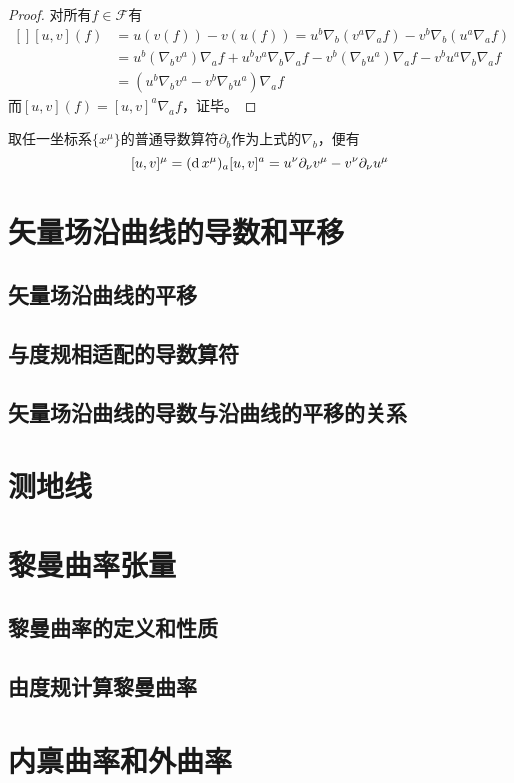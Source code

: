 \begin{proof}
对所有$f \in \mathscr{F}$有
$$\begin{aligned}[]
[u, v](f) & = u(v(f)) - v(u(f)) = u^b\nabla_b(v^a\nabla_af) - v^b\nabla_b(u^a\nabla_af) \\
& = u^b(\nabla_bv^a)\nabla_af + u^bv^a\nabla_b\nabla_af - v^b(\nabla_bu^a)\nabla_af - v^bu^a\nabla_b\nabla_af \\
& = (u^b\nabla_bv^a - v^b\nabla_bu^a)\nabla_af
\end{aligned}$$
而$[u, v](f) = [u, v]^a\nabla_af$，证毕。
\end{proof}

\begin{note}
取任一坐标系$\{x^\mu\}$的普通导数算符$\partial_b$作为上式的$\nabla_b$，便有
$$[u, v]^\mu = (\operatorname{d} x^\mu)_a[u, v]^a = u^\nu\partial_\nu v^\mu - v^\nu\partial_\nu u^\mu$$
\end{note}

\section{矢量场沿曲线的导数和平移}

\subsection{矢量场沿曲线的平移}

\subsection{与度规相适配的导数算符}

\subsection{矢量场沿曲线的导数与沿曲线的平移的关系}

\section{测地线}

\section{黎曼曲率张量}

\subsection{黎曼曲率的定义和性质}

\subsection{由度规计算黎曼曲率}

\section{内禀曲率和外曲率}

